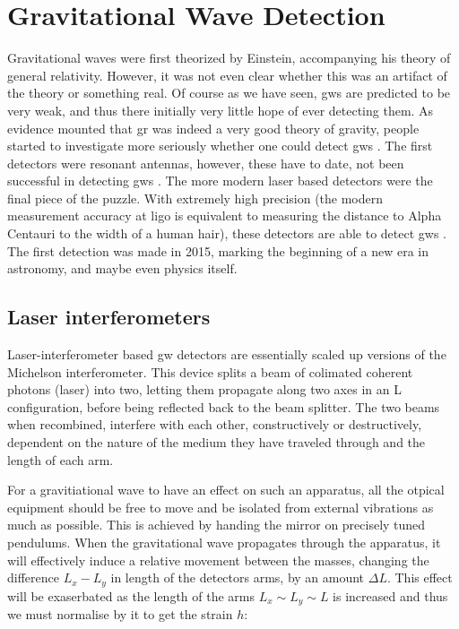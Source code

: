 \documentclass[
  10pt,
  a4paper,
  DIV=11,
  numbers=noendperiod,
  twoside]{scrreprt}
\DeclareRobustCommand{\[}{\begin{equation}}
\DeclareRobustCommand{\]}{\end{equation}}
\begin{document}

\hypertarget{sec-gwdetect}{%
\chapter{Gravitational Wave Detection}\label{sec-gwdetect}}

Gravitational waves were first theorized by Einstein, accompanying his
theory of general relativity. However, it was not even clear whether
this was an artifact of the theory or something real. Of course as we
have seen, \glspl{gw} are predicted to be very weak, and thus there
initially very little hope of ever detecting them. As evidence mounted
that \gls{gr} was indeed a very good theory of gravity, people started
to investigate more seriously whether one could detect \glspl{gw} . The
first detectors were resonant antennas, however, these have to date, not
been successful in detecting \glspl{gw} . The more modern laser based
detectors were the final piece of the puzzle. With extremely high
precision (the modern measurement accuracy at \gls{ligo} is equivalent
to measuring the distance to Alpha Centauri to the width of a human
hair), these detectors are able to detect \glspl{gw} . The first
detection was made in 2015, marking the beginning of a new era in
astronomy, and maybe even physics itself.

\hypertarget{laser-interferometers}{%
\section{Laser interferometers}\label{laser-interferometers}}

Laser-interferometer based \gls{gw} detectors are essentially scaled up
versions of the Michelson interferometer. This device splits a beam of
colimated coherent photons (laser) into two, letting them propagate
along two axes in an L configuration, before being reflected back to the
beam splitter. The two beams when recombined, interfere with each other,
constructively or destructively, dependent on the nature of the medium
they have traveled through and the length of each arm.

For a gravitiational wave to have an effect on such an apparatus, all
the otpical equipment should be free to move and be isolated from
external vibrations as much as possible. This is achieved by handing the
mirror on precisely tuned pendulums. When the gravitational wave
propagates through the apparatus, it will effectively induce a relative
movement between the masses, changing the difference \(L_x-L_y\) in
length of the detectors arms, by an amount \(\Delta L\). This effect
will be exaserbated as the length of the arms \(L_x \sim L_y \sim L\) is
increased and thus we must normalise by it to get the strain \(h\):
\end{document}

